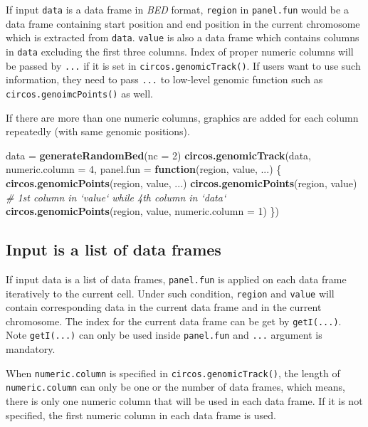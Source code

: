 \documentclass[]{book}
\newenvironment{Shaded}{\begin{snugshade}}{\end{snugshade}}
\newcommand{\KeywordTok}[1]{\textcolor[rgb]{0.13,0.29,0.53}{\textbf{#1}}}
\newcommand{\DataTypeTok}[1]{\textcolor[rgb]{0.13,0.29,0.53}{#1}}
\newcommand{\DecValTok}[1]{\textcolor[rgb]{0.00,0.00,0.81}{#1}}
\newcommand{\StringTok}[1]{\textcolor[rgb]{0.31,0.60,0.02}{#1}}
\newcommand{\CommentTok}[1]{\textcolor[rgb]{0.56,0.35,0.01}{\textit{#1}}}
\newcommand{\ControlFlowTok}[1]{\textcolor[rgb]{0.13,0.29,0.53}{\textbf{#1}}}
\newcommand{\NormalTok}[1]{#1}
\begin{document}
If input \texttt{data} is a data frame in \emph{BED} format,
\texttt{region} in \texttt{panel.fun} would be a data frame containing
start position and end position in the current chromosome which is
extracted from \texttt{data}. \texttt{value} is also a data frame which
contains columns in \texttt{data} excluding the first three columns.
Index of proper numeric columns will be passed by \texttt{...} if it is
set in \texttt{circos.genomicTrack()}. If users want to use such
information, they need to pass \texttt{...} to low-level genomic
function such as \texttt{circos.genoimcPoints()} as well.

If there are more than one numeric columns, graphics are added for each
column repeatedly (with same genomic positions).

\begin{Shaded}
\begin{Highlighting}[]
\NormalTok{data =}\StringTok{ }\KeywordTok{generateRandomBed}\NormalTok{(}\DataTypeTok{nc =} \DecValTok{2}\NormalTok{)}
\KeywordTok{circos.genomicTrack}\NormalTok{(data, }\DataTypeTok{numeric.column =} \DecValTok{4}\NormalTok{, }
    \DataTypeTok{panel.fun =} \ControlFlowTok{function}\NormalTok{(region, value, ...) \{}
        \KeywordTok{circos.genomicPoints}\NormalTok{(region, value, ...)}
        \KeywordTok{circos.genomicPoints}\NormalTok{(region, value)}
        \CommentTok{# 1st column in `value` while 4th column in `data`}
        \KeywordTok{circos.genomicPoints}\NormalTok{(region, value, }\DataTypeTok{numeric.column =} \DecValTok{1}\NormalTok{)}
\NormalTok{\})}
\end{Highlighting}
\end{Shaded}

\subsection{Input is a list of data
frames}\label{input-is-a-list-of-data-frames}

If input data is a list of data frames, \texttt{panel.fun} is applied on
each data frame iteratively to the current cell. Under such condition,
\texttt{region} and \texttt{value} will contain corresponding data in
the current data frame and in the current chromosome. The index for the
current data frame can be get by \texttt{getI(...)}. Note
\texttt{getI(...)} can only be used inside \texttt{panel.fun} and
\texttt{...} argument is mandatory.

When \texttt{numeric.column} is specified in
\texttt{circos.genomicTrack()}, the length of \texttt{numeric.column}
can only be one or the number of data frames, which means, there is only
one numeric column that will be used in each data frame. If it is not
specified, the first numeric column in each data frame is used.
\end{document}

